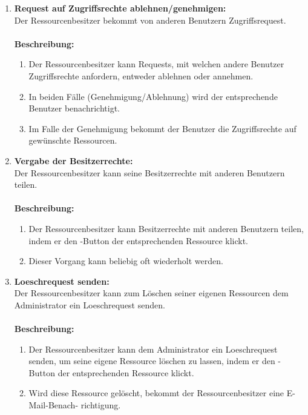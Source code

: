 \documentclass[parskip=full,11pt]{scrartcl}
\def\threedigits#1{%
  \ifnum#1<10 0\fi
  \ifnum#1<1 0\fi
  \number#1}
\begin{document}
\begin{enumerate}[label={\textbf{/F\protect\threedigits{\theenumi}0/}}, leftmargin=*, resume]
\item \label{FARB4} \textbf {Request auf Zugriffsrechte ablehnen/genehmigen:}\\ 
Der Ressourcenbesitzer bekommt von anderen Benutzern Zugriffsrequest. \\\\
\textbf{Beschreibung:}\\
\begin{enumerate}[label=(\arabic*), leftmargin=*]
\item Der Ressourcenbesitzer kann Requests, mit welchen andere Benutzer Zugriffsrechte anfordern, entweder ablehnen oder annehmen.
\item In beiden Fälle (Genehmigung/Ablehnung) wird der entsprechende Benutzer benachrichtigt.
\item Im Falle der Genehmigung bekommt der Benutzer die Zugriffsrechte auf  gewünschte Ressourcen.
\end{enumerate}

\item \label{FARB5} \textbf{Vergabe der Besitzerrechte:}\\
Der Ressourcenbesitzer kann seine Besitzerrechte mit anderen Benutzern teilen.\\\\
\textbf{Beschreibung:}\\
\begin{enumerate}[label=(\arabic*), leftmargin=*]
\item Der Ressourcenbesitzer kann Besitzerrechte mit anderen Benutzern teilen, indem er den \grqq -Button der entsprechenden Ressource klickt.
\item Dieser Vorgang kann beliebig oft wiederholt werden.
\end{enumerate}

\item \label{FARB6} \textbf{Loeschrequest senden:}\\
Der Ressourcenbesitzer kann zum Löschen seiner eigenen Ressourcen dem Administrator ein Loeschrequest senden.\\\\
\textbf{Beschreibung:}\\
\begin{enumerate}[label=(\arabic*), leftmargin=*]
\item Der Ressourcenbesitzer kann dem Administrator ein Loeschrequest senden, um seine eigene Ressource löschen zu lassen, indem er den \grqq -Button der entsprechenden Ressource klickt.
\item Wird diese Ressource gelöscht, bekommt der Ressourcenbesitzer eine E-Mail-Benach-
richtigung.
\end{enumerate}


\end{enumerate}
\end{document}
